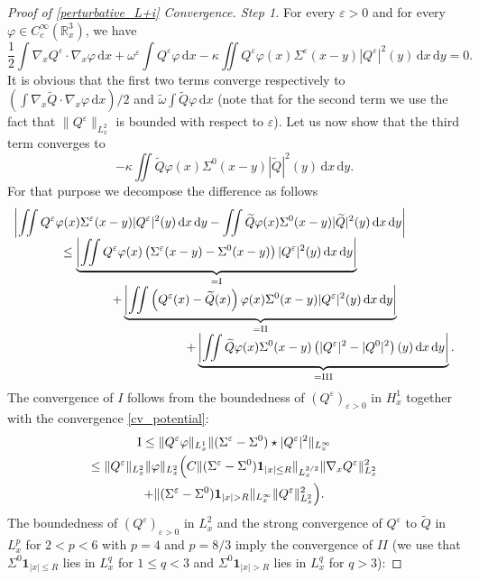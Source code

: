 \documentclass[10pt]{amsart}
\theoremstyle{definition}
\newenvironment{ProofOf}[1]{\begin{proof}[Proof of #1]}{\end{proof}}
\newcommand{\R}{\mathbb{R}}
\let\ds\displaystyle
\newcommand{\ud}{\, {\mathrm{d}}}
\begin{document}
\begin{ProofOf}{\eqref{perturbative_L+i} Convergence. Step 1}
For every $\varepsilon>0$ and for every $\varphi\in C_{c}^{\infty}(\R_{x}^{3})$, we have
\[
\frac{1}{2}\int\nabla_{x}Q^{\varepsilon}\cdot\nabla_{x}\varphi\ud x+\omega^{\varepsilon}\int Q^{\varepsilon}\varphi\ud x-\kappa\iint Q^{\varepsilon}\varphi(x)\Sigma^{\varepsilon}(x-y)|Q^{\varepsilon}|^{2}(y)\ud x\ud y=0.
\]
It is obvious that the first two terms converge respectively to $(\int\nabla_{x}\widetilde{Q}\cdot\nabla_{x}\varphi\ud x)/2$ and $\widetilde{\omega}\int\widetilde{Q}\varphi\ud x$ (note that for the second term we use the fact that $\|Q^{\varepsilon}\|_{L_{x}^{2}}$ is bounded with respect to $\varepsilon$). Let us now show that the third term converges to
\[
-\kappa\iint\widetilde{Q}\varphi(x)\Sigma^{0}(x-y)|\widetilde{Q}|^{2}(y)\ud x\ud y.
\]
For that purpose we decompose the difference as follows
\[
\begin{array}{l}
\ds \left|\iint Q^{\varepsilon}\varphi(x)\Sigma^{\varepsilon}(x-y)|Q^{\varepsilon}|^{2}(y)\ud x\ud y-\iint\widetilde{Q}\varphi(x)\Sigma^{0}(x-y)|\widetilde{Q}|^{2}(y)\ud x\ud y\right|\\
\ds\qquad\qquad \leq\underbrace{\left|\iint Q^{\varepsilon}\varphi(x)\left(\Sigma^{\varepsilon}(x-y)-\Sigma^{0}(x-y)\right)|Q^{\varepsilon}|^{2}(y)\ud x\ud y\right|}_{=\textup{I}}\\
\ds\qquad\qquad\qquad \qquad+\underbrace{\left|\iint \left(Q^{\varepsilon}(x)-\widetilde{Q}(x)\right)\varphi(x)\Sigma^{0}(x-y)|Q^{\varepsilon}|^{2}(y)\ud x\ud y\right|}_{=\textup{II}}\\
\ds\qquad\qquad\qquad \qquad\qquad\qquad \qquad +\underbrace{\biggl|\iint \widetilde{Q}\varphi(x)\Sigma^{0}(x-y)\left(|Q^{\varepsilon}|^{2}-|Q^{0}|^{2}\right)(y)\ud x\ud y\biggr|}_{=\textup{III}}.
\end{array}
\]
The convergence of $I$ follows from the boundedness of $(Q^{\varepsilon})_{\varepsilon>0}$ in $H_{x}^{1}$ together with the convergence \eqref{cv_potential}:
\begin{multline*}
\textup{I}\leq\|Q^{\varepsilon}\varphi\|_{L_{x}^{1}}\|(\Sigma^{\varepsilon}-\Sigma^{0})\star|Q^{\varepsilon}|^{2}\|_{L_{x}^{\infty}}\\
\leq\|Q^{\varepsilon}\|_{L_{x}^{2}}\|\varphi\|_{L_{x}^{2}}\Bigl(C\|(\Sigma^{\varepsilon}-\Sigma^{0})\mathbf{1}_{|x|\leq R}\|_{L_{x}^{3/2}}\|\nabla_{x}Q^{\varepsilon}\|_{L_{x}^{2}}^{2}
\\+\|(\Sigma^{\varepsilon}-\Sigma^{0})\mathbf{1}_{|x|>R}\|_{L_{x}^{\infty}}\|Q^{\varepsilon}\|_{L_{x}^{2}}^{2}\Bigr).
\end{multline*}
The boundedness of $(Q^{\varepsilon})_{\varepsilon>0}$ in $L_{x}^{2}$ and the strong convergence of $Q^{\varepsilon}$ to $\widetilde{Q}$ in $L_{x}^{p}$ for $2<p<6$ with $p=4$ and $p=8/3$ imply the convergence of $II$ (we use that $\Sigma^{0}\mathbf{1}_{|x|\leq R}$ lies in $L_{x}^{q}$ for $1\leq q<3$ and $\Sigma^{0}\mathbf{1}_{|x|>R}$ lies in $L_{x}^{q}$ for $q>3$):

\end{ProofOf}
\end{document}
